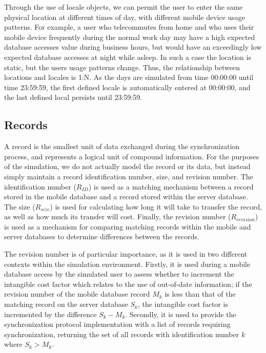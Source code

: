 Through the use of locale objects, we can permit the user to enter the same physical location at different times of day, with different mobile device usage patterns.  For example, a user who telecommutes from home and who uses their mobile device frequently during the normal work day may have a high expected database accesses value during business hours, but would have an exceedingly low expected database accesses at night while asleep.  In such a case the location is static, but the users usage patterns change.  Thus, the relationship between locations and locales is 1:N.  As the days are simulated from time 00:00:00 until time 23:59:59, the first defined locale is automatically entered at 00:00:00, and the last defined local persists until 23:59:59.

\subsection{Records}\label{records}

A record is the smallest unit of data exchanged during the synchronization process, and represents a logical unit of compound information.  For the purposes of the simulation, we do not actually model the record or its data, but instead simply maintain a record identification number, size, and revision number.  The identification number ($R_{ID}$) is used as a matching mechanism between a record stored in the mobile database and a record stored within the server database.  The size ($R_{size}$) is used for calculating how long it will take to transfer the record, as well as how much its transfer will cost.  Finally, the revision number ($R_{revision}$) is used as a mechanism for comparing matching records within the mobile and server databases to determine differences between the records.

The revision number is of particular importance, as it is used in two different contexts within the simulation environment.  Firstly, it is used during a mobile database access by the simulated user to assess whether to increment the intangible cost factor which relates to the use of out-of-date information; if the revision number of the mobile database record $M_k$ is less than that of the matching record on the server database $S_k$, the intangible cost factor is incremented by the difference $S_k - M_k$.  Secondly, it is used to provide the synchronization protocol implementation with a list of records requiring synchronization, returning the set of all records with identification number $k$ where $S_k > M_k$.

